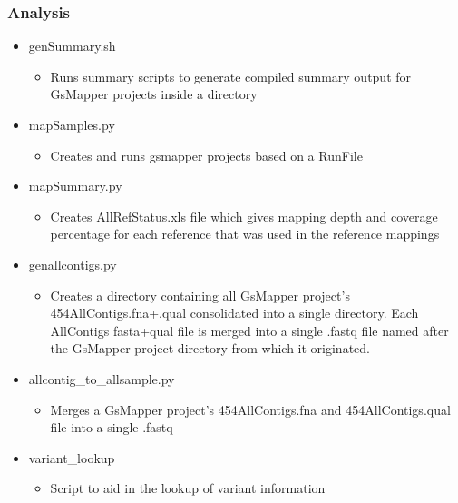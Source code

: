 \documentclass{article}
\begin{document}
\subsubsection{Analysis}
 \begin{itemize}
 \item genSummary.sh
  \begin{itemize}
   \item Runs summary scripts to generate compiled summary output for GsMapper projects inside a directory
  \end{itemize}
 \item mapSamples.py
  \begin{itemize}
   \item Creates and runs gsmapper projects based on a RunFile
  \end{itemize}
 \item mapSummary.py
  \begin{itemize}
   \item Creates AllRefStatus.xls file which gives mapping depth and coverage percentage for each reference that was used in the reference mappings
  \end{itemize}
 \item genallcontigs.py
  \begin{itemize}
   \item Creates a directory containing all GsMapper project's 454AllContigs.fna+.qual consolidated into a single directory. Each AllContigs fasta+qual file is merged into a single .fastq file named after the GsMapper project directory from which it originated.
   \end{itemize}
 \item allcontig\_to\_allsample.py
  \begin{itemize}
   \item Merges a GsMapper project's 454AllContigs.fna and 454AllContigs.qual file into a single .fastq
  \end{itemize}
 \item variant\_lookup
  \begin{itemize}
   \item Script to aid in the lookup of variant information
  \end{itemize}
 \end{itemize}
\end{document}
